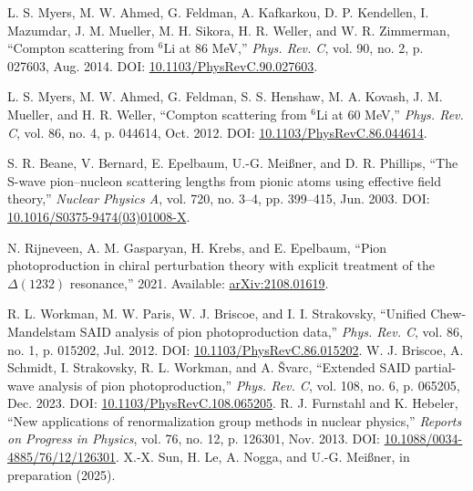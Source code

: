 \documentclass[a4paper,11pt]{article}
\begin{document}
\begin{thebibliography}{99}
L. S. Myers, M. W. Ahmed, G. Feldman, A. Kafkarkou, D. P. Kendellen, I. Mazumdar, J. M. Mueller, M. H. Sikora, H. R. Weller, and W. R. Zimmerman, ``Compton scattering from $^{6}\mathrm{Li}$ at 86 MeV,'' \textit{Phys. Rev. C}, vol. 90, no. 2, p. 027603, Aug. 2014. DOI: \href{https://link.aps.org/doi/10.1103/PhysRevC.90.027603}{10.1103/PhysRevC.90.027603}.

L. S. Myers, M. W. Ahmed, G. Feldman, S. S. Henshaw, M. A. Kovash, J. M. Mueller, and H. R. Weller, ``Compton scattering from $^{6}$Li at 60 MeV,'' \textit{Phys. Rev. C}, vol. 86, no. 4, p. 044614, Oct. 2012. DOI: \href{https://link.aps.org/doi/10.1103/PhysRevC.86.044614}{10.1103/PhysRevC.86.044614}.

S. R. Beane, V. Bernard, E. Epelbaum, U.-G. Meißner, and D. R. Phillips, ``The S-wave pion–nucleon scattering lengths from pionic atoms using effective field theory,'' \textit{Nuclear Physics A}, vol. 720, no. 3–4, pp. 399–415, Jun. 2003. DOI: \href{http://dx.doi.org/10.1016/S0375-9474(03)01008-X}{10.1016/S0375-9474(03)01008-X}.

N. Rijneveen, A. M. Gasparyan, H. Krebs, and E. Epelbaum, ``Pion photoproduction in chiral perturbation theory with explicit treatment of the $\Delta(1232)$ resonance,'' 2021. Available: \href{https://arxiv.org/abs/2108.01619}{arXiv:2108.01619}.

R. L. Workman, M. W. Paris, W. J. Briscoe, and I. I. Strakovsky, ``Unified Chew-Mandelstam SAID analysis of pion photoproduction data,'' \textit{Phys. Rev. C}, vol. 86, no. 1, p. 015202, Jul. 2012. DOI: \href{https://link.aps.org/doi/10.1103/PhysRevC.86.015202}{10.1103/PhysRevC.86.015202}.
W. J. Briscoe, A. Schmidt, I. Strakovsky, R. L. Workman, and A. \ifmmode {}\else \v{S}\fi{}varc, ``Extended SAID partial-wave analysis of pion photoproduction,'' \textit{Phys. Rev. C}, vol. 108, no. 6, p. 065205, Dec. 2023. DOI: \href{https://link.aps.org/doi/10.1103/PhysRevC.108.065205}{10.1103/PhysRevC.108.065205}.
R. J. Furnstahl and K. Hebeler, ``New applications of renormalization group methods in nuclear physics,'' \textit{Reports on Progress in Physics}, vol. 76, no. 12, p. 126301, Nov. 2013. DOI: \href{http://dx.doi.org/10.1088/0034-4885/76/12/126301}{10.1088/0034-4885/76/12/126301}.
X.-X. Sun, H. Le, A. Nogga, and U.-G. Meißner, in preparation (2025).
\end{thebibliography}
\end{document}
